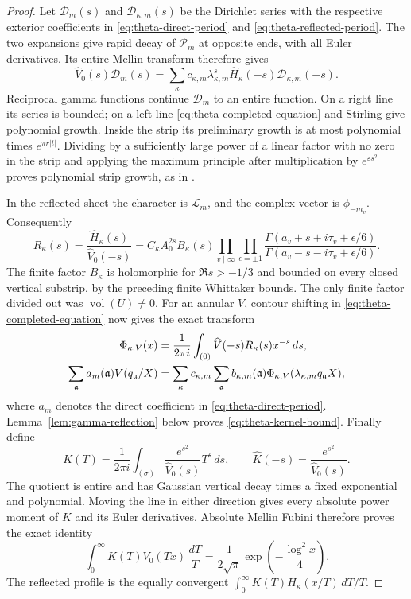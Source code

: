 \documentclass[11pt,a4paper]{article}
\numberwithin{equation}{section}
\theoremstyle{definition}
\theoremstyle{remark}
\begin{document}
\begin{proof}
Let $\mathcal D_m(s)$ and $\mathcal D_{\kappa,m}(s)$ be the Dirichlet
series with the respective exterior coefficients in
\eqref{eq:theta-direct-period} and \eqref{eq:theta-reflected-period}.
The two expansions give rapid decay of $\mathcal P_m$ at opposite ends,
with all Euler derivatives.  Its entire Mellin transform therefore gives
\begin{equation}\label{eq:theta-completed-equation}
 \widehat V_0(s)\mathcal D_m(s)
 =\sum_\kappa c_{\kappa,m}\lambda_{\kappa,m}^{s}
       \widehat H_\kappa(-s)\mathcal D_{\kappa,m}(-s).
\end{equation}
Reciprocal gamma functions continue $\mathcal D_m$ to an entire
function.  On a right line its series is bounded; on a left line
\eqref{eq:theta-completed-equation} and Stirling give polynomial growth.
Inside the strip its preliminary growth is at most polynomial times
$e^{\pi r|t|}$.  Dividing by a sufficiently large power of a linear
factor with no zero in the strip and applying the maximum principle
after multiplication by $e^{\varepsilon s^2}$ proves polynomial strip
growth, as in \cite[proof of Proposition~5.1, p.~33]{Q}.

In the reflected sheet the character is $\mathcal L_m$, and the complex
vector is $\phi_{-m_v}$.  Consequently
\begin{equation}\label{eq:theta-multiplier}
 R_\kappa(s)=\frac{\widehat H_\kappa(s)}{\widehat V_0(-s)}
 =C_\kappa A_0^{2s}B_\kappa(s)
   \prod_{v\mid\infty}\prod_{\epsilon=\pm1}
   \frac{\Gamma(a_v+s+i\tau_v+\epsilon/6)}
        {\Gamma(a_v-s-i\tau_v+\epsilon/6)}.
\end{equation}
The finite factor $B_\kappa$ is holomorphic for $\Re s>-1/3$ and
bounded on every closed vertical substrip, by the preceding finite
Whittaker bounds.  The only finite factor divided out was
$\operatorname{vol}(U)\ne0$.
For an annular $V$, contour shifting in
\eqref{eq:theta-completed-equation} now gives the exact transform
\begin{align}\label{eq:theta-annular-transform}
 \Phi_{\kappa,V}(x)&=\frac1{2\pi i}\int_{(0)}
       \widehat V(-s)R_\kappa(s)x^{-s}\,ds,\\
 \sum_{\mathfrak a}a_m(\mathfrak a)V(q_{\mathfrak a}/X)
   &=\sum_\kappa c_{\kappa,m}\sum_{\mathfrak a}b_{\kappa,m}(\mathfrak a)
       \Phi_{\kappa,V}(\lambda_{\kappa,m}q_{\mathfrak a}X),\notag
\end{align}
where $a_m$ denotes the direct coefficient in
\eqref{eq:theta-direct-period}.  Lemma~\ref{lem:gamma-reflection} below
proves \eqref{eq:theta-kernel-bound}.  Finally define
\[
 K(T)=\frac1{2\pi i}\int_{(\sigma)}
       \frac{e^{s^2}}{\widehat V_0(s)}T^s\,ds,
 \qquad \widehat K(-s)=\frac{e^{s^2}}{\widehat V_0(s)}.
\]
The quotient is entire and has Gaussian vertical decay times a fixed
exponential and polynomial.  Moving the line in either direction gives
every absolute power moment of $K$ and its Euler derivatives.
Absolute Mellin Fubini therefore proves the exact identity
\[
 \int_0^\infty K(T)V_0(Tx)\,\frac{dT}{T}
       =\frac1{2\sqrt\pi}\exp\!\left(-\frac{\log^2x}{4}\right).
\]
The reflected profile is the equally convergent
$\int_0^\infty K(T)H_\kappa(x/T)\,dT/T$.
\end{proof}
\end{document}
